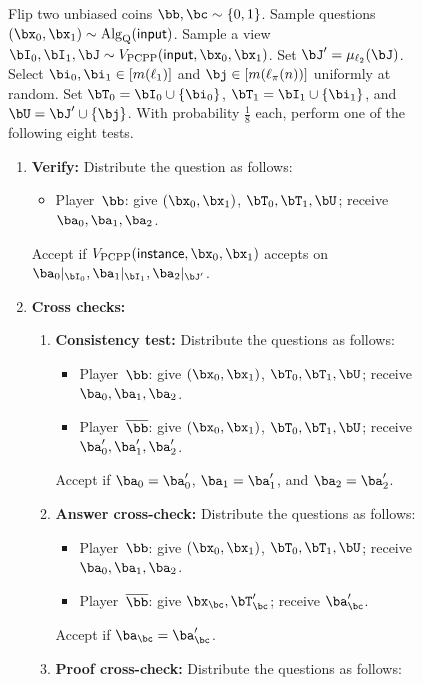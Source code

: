 {
	\begin{figure}Flip two unbiased coins $\bb, \bc \sim \{0, 1\}$. 
    		Sample questions $(\bx_0, \bx_1) \sim \mathrm{Alg}_{\mathrm{Q}}(\mathsf{input})$.
		Sample a view $\bI_0, \bI_1, \bJ \sim V_{\mathrm{PCPP}}(\mathsf{input}, \bx_0, \bx_1)$.
		Set $\bJ' = \mu_{\ell_2}(\bJ)$.
		Select $\bi_0, \bi_1 \in [m(\ell_1)]$ and $\bj \in [m(\ell_\pi(n))]$ uniformly at random.
		Set $\bT_0 = \bI_0 \cup \{\bi_0\}$, $\bT_1 = \bI_1 \cup \{\bi_1\}$, and $\bU = \bJ' \cup \{\bj\}$.
	With probability $\frac{1}{8}$ each, perform one of the following eight tests.
	\begin{enumerate}
	\item \textbf{Verify:}
		Distribute the question as follows:
			\begin{itemize}
			\item[$\circ$] Player~$\bb$: give $(\bx_0, \bx_1)$, $\bT_0, \bT_1, \bU$; receive $\ba_0, \ba_1, \ba_2$.
			\end{itemize}
		Accept if $V_{\mathrm{PCPP}}(\mathsf{instance}, \bx_0, \bx_1)$ accepts on $\ba_0|_{\bI_0}, \ba_1|_{\bI_1}, \ba_2|_{\bJ'}$.
	\item \textbf{Cross checks:}
	\begin{enumerate}
	\item \textbf{Consistency test:} Distribute the questions as follows:
			\begin{itemize}
			\item[$\circ$] Player~$\bb$: give $(\bx_0, \bx_1)$, $\bT_0, \bT_1, \bU$; receive $\ba_0, \ba_1, \ba_2$.
			\item[$\circ$] Player~$\overline{\bb}$: give $(\bx_0, \bx_1)$, $\bT_0, \bT_1, \bU$; receive $\ba_0', \ba_1', \ba_2'$.
			\end{itemize}
		Accept if $\ba_0 = \ba_0'$, $\ba_1 = \ba_1'$, and $\ba_2 = \ba_2'$.
	\item \textbf{Answer cross-check:} Distribute the questions as follows:
			\begin{itemize}
			\item[$\circ$] Player~$\bb$: give $(\bx_0, \bx_1)$, $\bT_0, \bT_1, \bU$; receive $\ba_0, \ba_1, \ba_2$.
			\item[$\circ$] Player~$\overline{\bb}$: give $\bx_{\bc}, \bT_{\bc}'$; receive $\ba_{\bc}'$.
			\end{itemize}
		Accept if $\ba_{\bc} = \ba_{\bc}'$.
	\item \textbf{Proof cross-check:} Distribute the questions as follows:
			\begin{itemize}

\end{itemize}
\end{enumerate}
\end{enumerate}
\end{figure}}
